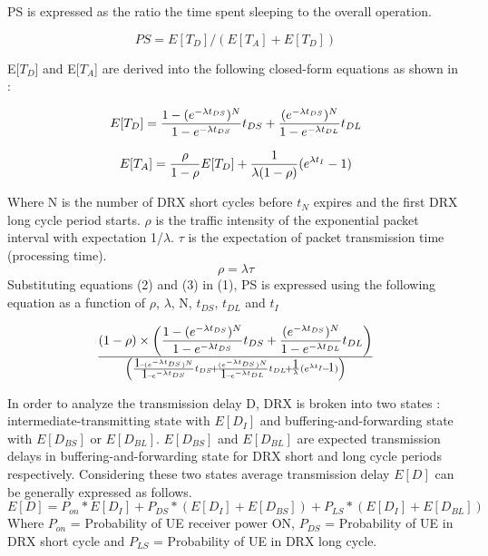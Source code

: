 \documentclass[8pt]{article}
\begin{document}
PS is expressed as the ratio the time spent sleeping to the overall operation.\newline

\begin{equation}
	PS = E[T_{D}]/\left(E[T_{A}] + E[T_{D}]\right)
\end{equation}

E[\(T_{D}\)] and E[\(T_{A}\)] are derived into the following closed-form equations as shown in \cite{6151867} :

\begin{equation}
 E[T_{D}]= {\hbox{1} - (e^{-\lambda t_{DS}})^{N} \over \hbox{1} - e^{-\lambda t_{DS}}} t_{DS} + {(e^{-\lambda t_{DS}})^{N}\over \hbox{1} - e^{-\lambda t_{DL}}} t_{DL}		
\end{equation}

\begin{equation}
 E[T_{A}] = {\rho\over \hbox{1} - \rho} E[T_{D}] + {\hbox{1}\over \lambda (\hbox{1} - \rho)} (e^{\lambda t_{I}} - \hbox{1})
\end{equation}

Where N is the number of DRX short cycles before \(t_{N}\) expires and the first DRX long cycle period starts. \(\rho\) is the traffic intensity of the exponential packet interval with expectation 1/\(\lambda\). \(\tau\) is the expectation of packet transmission time (processing time).
\begin{equation}
	\rho = \lambda\tau
\end{equation}
Substituting equations (2) and (3) in (1), PS is expressed using the following equation as a function of \(\rho\), \(\lambda\), N, \(t_{DS}\), \(t_{DL}\) and \(t_{I}\)

\begin{equation}
	(\hbox{1} - \rho) \times \left({\hbox{1} - (e^{- \lambda t_{DS}})^{N}\over \hbox{1} - e^{-\lambda t_{DS}}} t_{DS} + {(e^{-\lambda t_{DS}})^{N}\over \hbox{1} - e^{- \lambda t_{DL}}}t_{DL} \right) \over \left({\hbox{1} \!-\! (e^{-\lambda t_{DS}})^{N}\over \hbox{1} \!-\! e^{-\lambda t_{DS}}} t_{DS} \!+\! {(e^{-\lambda t_{DS}})^{N}\over \hbox{1} \!-\! e^{-\lambda t_{DL}}}t_{DL} \!+\! {\hbox{1}\over \lambda} (e^{\lambda t_{I}} \!-\! \hbox{1})\right)
\end{equation}

In order to analyze the transmission delay D, DRX is broken into two states : intermediate-transmitting state with \(E[D_{I}]\) and buffering-and-forwarding state with \(E[D_{BS}]\) or \(E[D_{BL}]\). \(E[D_{BS}]\) and \(E[D_{BL}]\) are expected transmission delays in buffering-and-forwarding state for DRX short and long cycle periods respectively. Considering these two states average transmission delay \(E[D]\) can be generally expressed as follows.
\begin{equation}
	E[D] = P_{on}*E[D_I] + P_{DS}*(E[D_{I}] + E[D_{BS}]) + P_{LS}*(E[D_{I}] + E[D_{BL}])
\end{equation}
Where \(P_{on}\) = Probability of UE receiver power ON, \(P_{DS}\) = Probability of UE in DRX short cycle and \(P_{LS}\) = Probability of UE in DRX long cycle.
\end{document}
